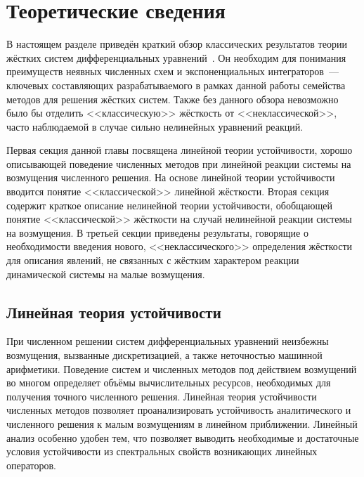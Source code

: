 \chapter{Теоретические сведения}
\label{chapter:theory} 

В настоящем разделе приведён краткий обзор классических результатов
теории жёстких систем дифференциальных уравнений~\cite{heirer1999solvingode2, lambert1991methods}.
Он необходим для понимания преимуществ неявных численных схем и экспоненциальных интеграторов~---
ключевых составляющих разрабатываемого в рамках данной работы семейства методов для решения жёстких систем.
Также без данного обзора невозможно было бы отделить <<классическую>> жёсткость от <<неклассической>>,
часто наблюдаемой в случае сильно нелинейных уравнений реакций.

Первая секция данной главы посвящена линейной теории устойчивости,
хорошо описывающей поведение численных методов при линейной реакции системы на возмущения численного решения.
На основе линейной теории устойчивости вводится понятие <<классической>> линейной жёсткости.
Вторая секция содержит краткое описание нелинейной теории устойчивости,
обобщающей понятие <<классической>> жёсткости на случай нелинейной реакции системы на возмущения.
В третьей секции приведены результаты, говорящие о необходимости введения нового,
<<неклассического>> определения жёсткости для описания явлений,
не связанных с жёстким характером реакции динамической системы на малые возмущения.


\section{Линейная теория устойчивости}
\label{section:theory:linear_stability_theory}

При численном решении систем дифференциальных уравнений неизбежны возмущения,
вызванные дискретизацией, а также неточностью машинной арифметики.
Поведение систем и численных методов под действием возмущений во многом определяет
объёмы вычислительных ресурсов, необходимых для получения точного численного решения.
Линейная теория устойчивости численных методов позволяет проанализировать устойчивость
аналитического и численного решения к малым возмущениям в линейном приближении.
Линейный анализ особенно удобен тем,
что позволяет выводить необходимые и достаточные условия устойчивости
из спектральных свойств возникающих линейных операторов.

